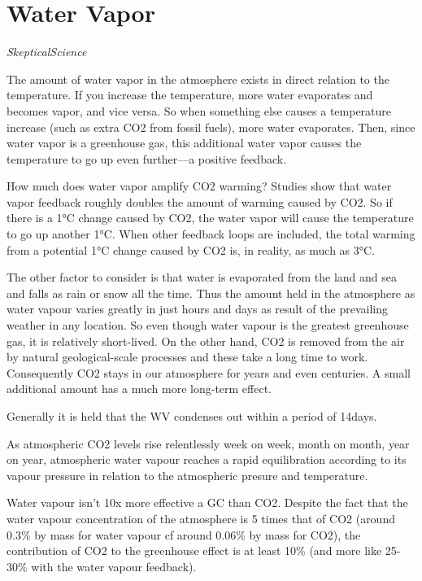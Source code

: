 \documentclass[
]{book}
\begin{document}
\hypertarget{water-vapor}{%
\chapter{Water Vapor}\label{water-vapor}}

\emph{SkepticalScience}

The amount of water vapor in the atmosphere exists in direct relation to the temperature. If you increase the temperature, more water evaporates and becomes vapor, and vice versa. So when something else causes a temperature increase (such as extra CO2 from fossil fuels), more water evaporates. Then, since water vapor is a greenhouse gas, this additional water vapor causes the temperature to go up even further---a positive feedback.

How much does water vapor amplify CO2 warming? Studies show that water vapor feedback roughly doubles the amount of warming caused by CO2. So if there is a 1°C change caused by CO2, the water vapor will cause the temperature to go up another 1°C. When other feedback loops are included, the total warming from a potential 1°C change caused by CO2 is, in reality, as much as 3°C.

The other factor to consider is that water is evaporated from the land and sea and falls as rain or snow all the time. Thus the amount held in the atmosphere as water vapour varies greatly in just hours and days as result of the prevailing weather in any location. So even though water vapour is the greatest greenhouse gas, it is relatively short-lived. On the other hand, CO2 is removed from the air by natural geological-scale processes and these take a long time to work. Consequently CO2 stays in our atmosphere for years and even centuries. A small additional amount has a much more long-term effect.

Generally it is held that the WV condenses out within a period of 14days.

As atmospheric CO2 levels rise relentlessly week on week, month on month, year on year, atmospheric water vapour reaches a rapid equilibration according to its vapour pressure in relation to the atmospheric presure and temperature.

Water vapour isn't 10x more effective a GC than CO2. Despite the fact that the water vapour concentration of the atmosphere is 5 times that of CO2 (around 0.3\% by mass for water vapour cf around 0.06\% by mass for CO2), the contribution of CO2 to the greenhouse effect is at least 10\% (and more like 25-30\% with the water vapour feedback).
\end{document}

